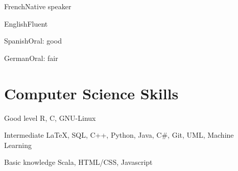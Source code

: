 \documentclass{tccv}
\begin{document}
\begin{factlist}
\item{French}{Native speaker}
\item{English}{Fluent}
\item{Spanish}{Oral: good}
\item{German}{Oral: fair}
\end{factlist}

\section{Computer Science Skills}

\begin{factlist}

\item{Good level}
     {R, C, GNU-Linux}
     
\item{Intermediate}
     {\LaTeX, SQL, C++, Python, Java, C\#, Git, UML, Machine Learning}
     
\item{Basic knowledge}
     {Scala, HTML/CSS, Javascript}

\end{factlist}
\end{document}
